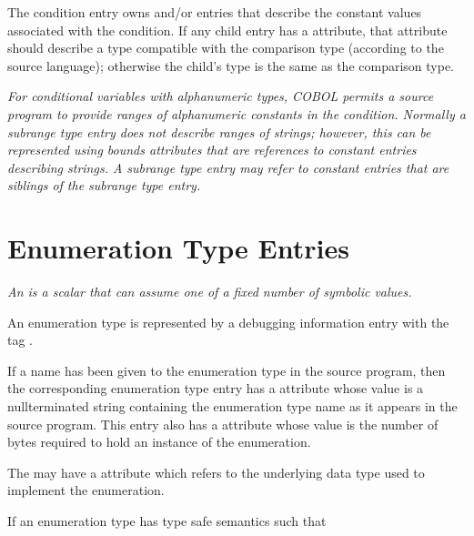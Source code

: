 The condition entry owns  and/or
 entries that describe the constant
values associated with the condition. If any child entry 
has
a  attribute,
that attribute should describe a type
compatible with the comparison type (according to the source
language); otherwise the child\textquoteright s type is the same as the
comparison type.

\textit{For conditional variables with alphanumeric types, COBOL
permits a source program to provide ranges of alphanumeric
constants in the condition. Normally a subrange type entry
does not describe ranges of strings; however, this can be
represented using bounds attributes that are references to
constant entries describing strings. A subrange type entry may
refer to constant entries that are siblings of the subrange
type entry.}


\section{Enumeration Type Entries}
\label{chap:enumerationtypeentries}

\textit{An  is a scalar that can assume one of
a fixed number of symbolic values.}

An enumeration type is represented by a debugging information
entry with the tag 
.

If a name has been given to the enumeration type in the source
program, then the corresponding enumeration type entry has
a  attribute
whose value is a null\dash terminated
string containing the enumeration type name as it appears
in the source program. This entry also has a 
attribute whose  
value is the number of bytes
required to hold an instance of the enumeration.

The 
may have 
a  attribute
which refers to the underlying data type used to implement
the enumeration.

If an enumeration type has type safe 
semantics such that

